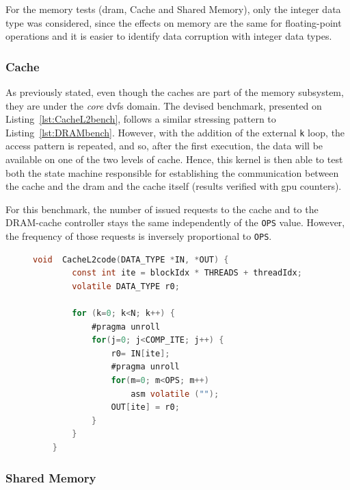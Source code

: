 For the memory tests (\acrshort{dram}, Cache and Shared Memory), only the integer data type was considered, since the effects on memory are the same for floating-point operations and it is easier to identify data corruption with integer data types.


\subsubsection{Cache}

As previously stated, even though the caches are part of the memory subsystem, they are under the \textit{core} \acrshort{dvfs} domain. The devised benchmark, presented on   Listing~\ref{lst:CacheL2bench}, follows a similar stressing pattern to Listing~\ref{lst:DRAMbench}. However, with the addition of the external \texttt{k} loop, the access pattern is repeated, and so, after the first execution, the data will be available on one of the two levels of cache. Hence, this kernel is then able to test both the state machine responsible for establishing the communication between the cache and the \acrshort{dram} and the cache itself (results verified with \acrshort{gpu} counters).

For this benchmark, the number of issued requests to the cache and to the DRAM-cache controller stays the same independently of the \texttt{OPS} value. However, the frequency of those requests is inversely proportional to \texttt{OPS}.

\begin{figure}[h]
    \begin{lstlisting}[language=C, caption=CacheL2 Benchmark Code, label=lst:CacheL2bench, basicstyle=\footnotesize\ttfamily,abovecaptionskip=0pt, captionpos=b]
    void  CacheL2code(DATA_TYPE *IN, *OUT) {
        const int ite = blockIdx * THREADS + threadIdx;
        volatile DATA_TYPE r0;
        
        for (k=0; k<N; k++) {
            #pragma unroll
            for(j=0; j<COMP_ITE; j++) {
                r0= IN[ite];
                #pragma unroll
                for(m=0; m<OPS; m++)    
                    asm volatile ("");
                OUT[ite] = r0;
            }
        }
    }
    \end{lstlisting}
\end{figure}

\subsubsection{Shared Memory}

